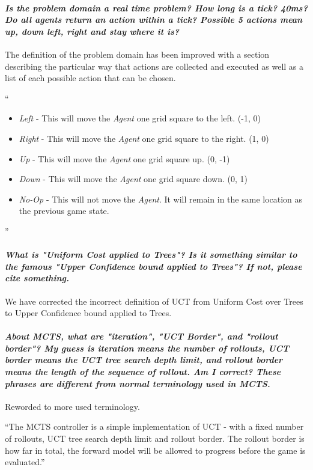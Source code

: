 \documentclass{article}
\begin{document}
\paragraph*{\textit{Is the problem domain a real time problem? How long is a tick? 40ms? Do all agents return an action within a tick? Possible 5 actions mean up, down left, right and stay where it is?}}
The definition of the problem domain has been improved with a section describing the particular way that actions are collected and executed as well as a list of each possible action that can be chosen.

``\begin{itemize}
\item{\emph{Left} - This will move the \emph{Agent} one grid square to the left. (-1, 0)}
\item{\emph{Right} - This will move the \emph{Agent} one grid square to the right. (1, 0)}
\item{\emph{Up} - This will move the \emph{Agent} one grid square up. (0, -1)}
\item{\emph{Down} - This will move the \emph{Agent} one grid square down. (0, 1)}
\item{\emph{No-Op} - This will not move the \emph{Agent}. It will remain in the same location as the previous game state.}
\end{itemize}''

\paragraph*{\textit{What is "Uniform Cost applied to Trees"? Is it something similar to the famous "Upper Confidence bound applied to Trees"? If not, please cite something.}}
We have corrected the incorrect definition of UCT from Uniform Cost over Trees to Upper Confidence bound applied to Trees.
\paragraph*{\textit{About MCTS, what are "iteration", "UCT Border", and "rollout border"? My guess is iteration means the number of rollouts,
UCT border means the UCT tree search depth limit, and rollout border means the length of the sequence of rollout. Am I correct? These phrases are different from normal terminology used in MCTS.}}
Reworded to more used terminology.

``The MCTS controller is a simple implementation of UCT - with a fixed number of rollouts, UCT tree search depth limit and rollout border. The rollout border is how far in total, the forward model will be allowed to progress before the game is evaluated.''
\end{document}
